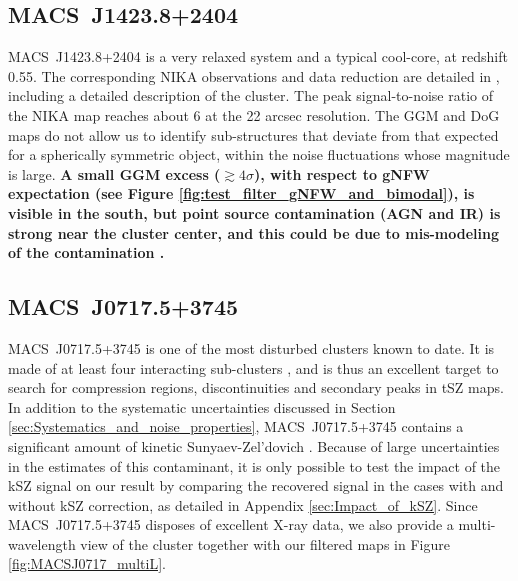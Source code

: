 \documentclass[twocolumn,traditabstract]{aa}
\begin{document}
\subsection{MACS~J1423.8+2404}
\mbox{MACS~J1423.8+2404} is a very relaxed system and a typical cool-core, at redshift 0.55. The corresponding NIKA observations and data reduction are detailed in \cite{Adam2016a}, including a detailed description of the cluster. The peak signal-to-noise ratio of the NIKA map reaches about 6 at the 22 arcsec resolution. The GGM and DoG maps do not allow us to identify sub-structures that deviate from that expected for a spherically symmetric object, within the noise fluctuations whose magnitude is large. {\bf A small GGM excess ($\gtrsim 4 \sigma$), with respect to gNFW expectation (see Figure \ref{fig:test_filter_gNFW_and_bimodal}), is visible in the south, but point source contamination (AGN and IR) is strong near the cluster center, and this could be due to mis-modeling of the contamination \citep[see][and the discussion of Section \ref{sec:Point_sources_residuals}]{Adam2016a}.}

\subsection{MACS~J0717.5+3745}\label{sec:MACSJ0717}
\mbox{MACS~J0717.5+3745} is one of the most disturbed clusters known to date. It is made of at least four interacting sub-clusters \citep{Ma2009}, and is thus an excellent target to search for compression regions, discontinuities and secondary peaks in tSZ maps. In addition to the systematic uncertainties discussed in Section \ref{sec:Systematics_and_noise_properties}, \mbox{MACS~J0717.5+3745} contains a significant amount of kinetic Sunyaev-Zel'dovich \citep[kSZ,][]{Sunyaev1980}. Because of large uncertainties in the estimates of this contaminant, it is only possible to test the impact of the kSZ signal on our result by comparing the recovered signal in the cases with and without kSZ correction, as detailed in Appendix \ref{sec:Impact_of_kSZ}. Since \mbox{MACS~J0717.5+3745} disposes of excellent X-ray data, we also provide a multi-wavelength view of the cluster together with our filtered maps in Figure \ref{fig:MACSJ0717_multiL}.
\end{document}
